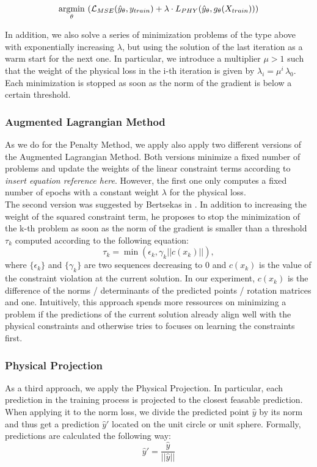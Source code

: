 \[\underset{\theta}{\operatorname*{argmin}} \,\, (\mathcal{L}_{MSE}(\hat{y}_\theta, y_{train}) + \lambda \cdot L_{PHY}(\hat{y}_\theta, g_\theta(X_{train})))\]

In addition, we also solve a series of minimization problems of the type above with exponentially increasing $\lambda$, but using the solution of the last iteration as a warm start for the next one. In particular, we introduce a multiplier $\mu > 1$ such that the weight of the physical loss in the i-th iteration is given by $\lambda_i = \mu^i \, \lambda_0$. Each minimization is stopped as soon as the norm of the gradient is below a certain threshold.

\subsubsection{Augmented Lagrangian Method}

As we do for the Penalty Method, we apply also apply two different versions of the Augmented Lagrangian Method. Both versions minimize a fixed number of problems and update the weights of the linear constraint terms according to \textit{insert equation reference here}. However, the first one only computes a fixed number of epochs with a constant weight $\lambda$ for the physical loss.\\
\indent The second version was suggested by Bertsekas in \cite{Yurkiewicz1985ConstrainedOA}. In addition to increasing the weight of the squared constraint term, he proposes to stop the minimization of the k-th problem as soon as the norm of the gradient is smaller than a threshold $\tau_k$ computed according to the following equation:
\[\tau_k = \min(\epsilon_k, \gamma_k ||c(x_k)||), \]
where $\{\epsilon_k\}$ and $\{\gamma_k \}$ are two sequences decreasing to 0 and $c(x_k)$ is the value of the constraint violation at the current solution. In our experiment, $c(x_k)$ is the difference of the norms / determinants of the predicted points / rotation matrices and one. Intuitively, this approach spends more ressources on minimizing a problem if the predictions of the current solution already align well with the physical constraints and otherwise tries to focuses on learning the constraints first.

\subsubsection{Physical Projection}

As a third approach, we apply the Physical Projection. In particular, each prediction in the training process is projected to the closest feasable prediction. When applying it to the norm loss, we divide the predicted point $\hat{y}$ by its norm and thus get a prediction $\hat{y}'$ located on the unit circle or unit sphere. Formally, predictions are calculated the following way:
\[\hat{y}' = \frac{\hat{y}}{||\hat{y}||} \]

